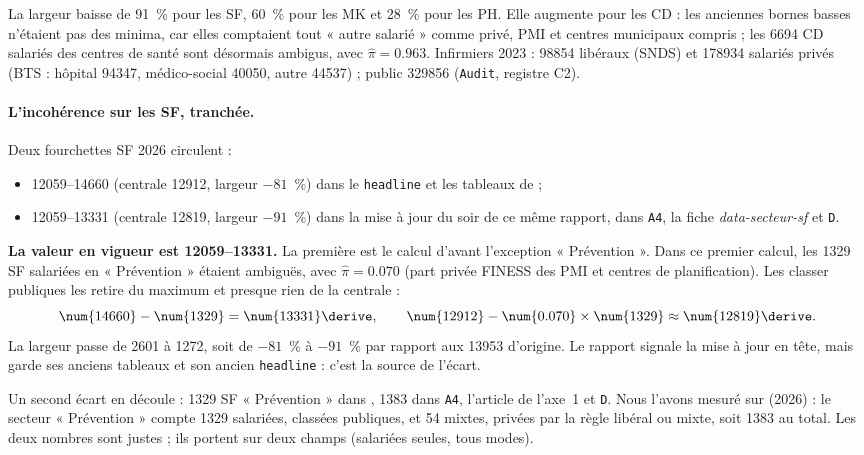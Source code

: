 La largeur baisse de 91~\%\derive{} pour les SF, 60~\%\derive{} pour les MK et 28~\%\derive{} pour les PH.
Elle augmente pour les CD : les anciennes bornes basses n'étaient pas des minima, car elles comptaient tout
« autre salarié » comme privé, PMI et centres municipaux compris ; les \num{6694}\mesure{} CD salariés des
centres de santé sont désormais ambigus, avec $\hat\pi = \num{0.963}$\mesure. Infirmiers 2023 : \num{98854}\mesure{}
libéraux (SNDS) et \num{178934}\mesure{} salariés privés (BTS : hôpital \num{94347}, médico-social \num{40050},
autre \num{44537}\mesure) ; public \num{329856}\mesure{} (\texttt{Audit}, registre C2).

\paragraph{L'incohérence sur les SF, tranchée.} Deux fourchettes SF 2026 circulent :
\begin{itemize}
  \item \num{12059}--\num{14660}\mesure{} (centrale \num{12912}, largeur $-81$~\%\derive) dans le
  \texttt{headline} et les tableaux de  ;
  \item \num{12059}--\num{13331}\mesure{} (centrale \num{12819}\derive, largeur $-91$~\%\derive) dans la mise à
  jour du soir de ce même rapport, dans \texttt{A4}, la fiche \emph{data-secteur-sf} et \texttt{D}.
\end{itemize}
\textbf{La valeur en vigueur est \num{12059}--\num{13331}.} La première est le calcul d'avant l'exception
« Prévention ». Dans ce premier calcul, les \num{1329}\mesure{} SF salariées en « Prévention » étaient ambiguës,
avec $\hat\pi = \num{0.070}$\mesure{} (part privée FINESS des PMI et centres de planification). Les classer
publiques les retire du maximum et presque rien de la centrale :
\[
\num{14660} - \num{1329} = \num{13331}\derive, \qquad
\num{12912} - \num{0.070}\times\num{1329} \approx \num{12819}\derive .
\]
La largeur passe de \num{2601}\derive{} à \num{1272}\derive{}, soit de $-81$~\% à $-91$~\%\derive{} par
rapport aux \num{13953}\derive{} d'origine. Le rapport signale la mise à jour en tête, mais garde ses anciens
tableaux et son ancien \texttt{headline} : c'est la source de l'écart.

Un second écart en découle : \num{1329}\mesure{} SF « Prévention » dans , \num{1383} dans \texttt{A4},
l'article de l'axe~1 et \texttt{D}. Nous l'avons mesuré sur  (2026) : le
secteur « Prévention » compte \num{1329}\mesure{} salariées, classées publiques, et \num{54}\mesure{} mixtes,
privées par la règle libéral ou mixte, soit \num{1383}\mesure{} au total. Les deux nombres sont justes ; ils
portent sur deux champs (salariées seules, tous modes).

